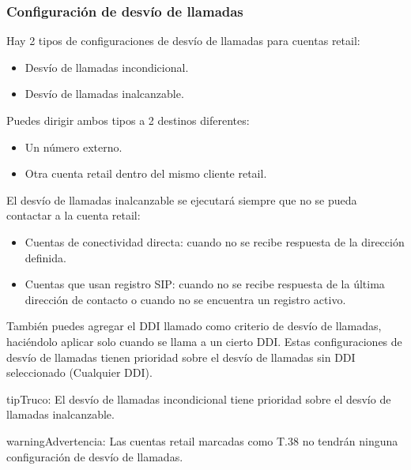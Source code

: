 \documentclass[letterpaper,10pt,spanish]{sphinxmanual}
\begin{document}
\subsubsection{Configuración de desvío de llamadas}
\label{administration_portal/client/retail/retail_accounts:call-forwarding-settings}
Hay 2 tipos de configuraciones de desvío de llamadas para cuentas retail:
\begin{itemize}
\item {} 
Desvío de llamadas incondicional.

\item {} 
Desvío de llamadas inalcanzable.

\end{itemize}

Puedes dirigir ambos tipos a 2 destinos diferentes:
\begin{itemize}
\item {} 
Un número externo.

\item {} 
Otra cuenta retail dentro del mismo cliente retail.

\end{itemize}

El desvío de llamadas inalcanzable se ejecutará siempre que no se pueda contactar a la cuenta retail:
\begin{itemize}
\item {} 
Cuentas de conectividad directa: cuando no se recibe respuesta de la dirección definida.

\item {} 
Cuentas que usan registro SIP: cuando no se recibe respuesta de la última dirección de contacto o cuando no se encuentra un registro activo.

\end{itemize}

También puedes agregar el DDI llamado como criterio de desvío de llamadas, haciéndolo aplicar solo cuando se llama a un cierto DDI. Estas configuraciones de desvío de llamadas tienen prioridad sobre el desvío de llamadas sin DDI seleccionado (Cualquier DDI).

\begin{notice}{tip}{Truco:}
El desvío de llamadas incondicional tiene prioridad sobre el desvío de llamadas inalcanzable.
\end{notice}

\begin{notice}{warning}{Advertencia:}
Las cuentas retail marcadas como T.38 no tendrán ninguna configuración de desvío de llamadas.
\end{notice}
\end{document}
